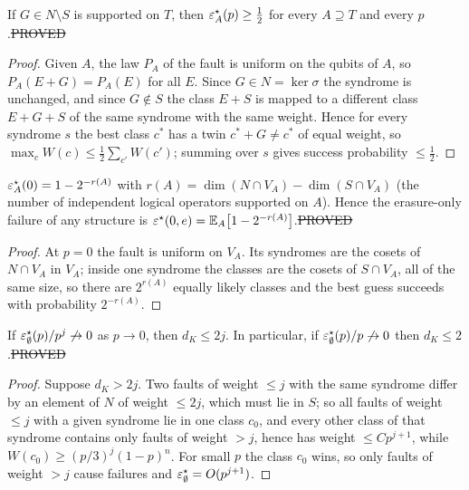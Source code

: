\begin{lemma}\label{lem:jump}
If $G\in N\setminus S$ is supported on $T$, then $\varepsilon^{\star}_A(p)\ge\tfrac12$ for every $A\supseteq T$ and every $p$.\hfill\st{PROVED}
\end{lemma}
\begin{proof}
Given $A$, the law $P_A$ of the fault is uniform on the qubits of $A$, so $P_A(E+G)=P_A(E)$ for all $E$. Since $G\in N=\ker\sigma$ the syndrome is unchanged, and since $G\notin S$ the class $E+S$ is mapped to a different class $E+G+S$ of the same syndrome with the same weight.
Hence for every syndrome $s$ the best class $c^\ast$ has a twin $c^\ast+G\neq c^\ast$ of equal weight, so $\max_cW(c)\le\tfrac12\sum_{c'}W(c')$; summing over $s$ gives success probability $\le\tfrac12$.
\end{proof}

\begin{lemma}\label{lem:erasure-only}
$\varepsilon^{\star}_A(0)=1-2^{-r(A)}$ with $r(A)=\dim(N\cap V_A)-\dim(S\cap V_A)$ (the number of independent logical operators supported on $A$). Hence the erasure-only failure of any structure is $\varepsilon^{\star}(0,e)=\mathbb E_A\big[1-2^{-r(A)}\big]$.\hfill\st{PROVED}
\end{lemma}
\begin{proof}
At $p=0$ the fault is uniform on $V_A$. Its syndromes are the cosets of $N\cap V_A$ in $V_A$; inside one syndrome the classes are the cosets of $S\cap V_A$, all of the same size, so there are $2^{r(A)}$ equally likely classes and the best guess succeeds with probability $2^{-r(A)}$.
\end{proof}

\begin{lemma}\label{lem:first-order}
If $\varepsilon^{\star}_\emptyset(p)/p^j\not\to0$ as $p\to0$, then $d_K\le2j$. In particular, if $\varepsilon^{\star}_\emptyset(p)/p\not\to0$ then $d_K\le2$.\hfill\st{PROVED}
\end{lemma}
\begin{proof}
Suppose $d_K>2j$. Two faults of weight $\le j$ with the same syndrome differ by an element of $N$ of weight $\le2j$, which must lie in $S$; so all faults of weight $\le j$ with a given syndrome lie in one class $c_0$, and every other class of that syndrome contains only faults of weight $>j$, hence has weight $\le Cp^{j+1}$, while $W(c_0)\ge(p/3)^j(1-p)^n$. For small $p$ the class $c_0$ wins, so only faults of weight $>j$ cause failures and $\varepsilon^{\star}_\emptyset=O(p^{j+1})$.
\end{proof}

